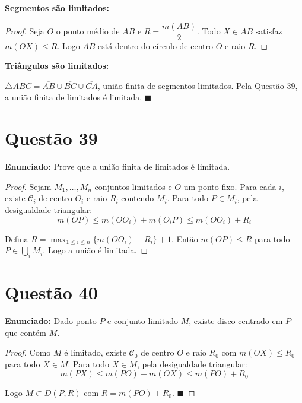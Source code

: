 \documentclass[12pt,a4paper]{article}
\begin{document}
\textbf{Segmentos s\~ao limitados:}

\begin{proof}
Seja $O$ o ponto m\'edio de $\overline{AB}$ e $R = \dfrac{m(AB)}{2}$. Todo $X \in \overline{AB}$ satisfaz $m(OX) \leq R$. Logo $\overline{AB}$ est\'a dentro do c\'irculo de centro $O$ e raio $R$.
\end{proof}

\textbf{Tri\^angulos s\~ao limitados:}

$\triangle ABC = \overline{AB} \cup \overline{BC} \cup \overline{CA}$, uni\~ao finita de segmentos limitados. Pela Quest\~ao 39, a uni\~ao finita de limitados \'e limitada. $\blacksquare$

\section*{Quest\~ao 39}

\textbf{Enunciado:} Prove que a uni\~ao finita de limitados \'e limitada.

\begin{proof}
Sejam $M_1, \ldots, M_n$ conjuntos limitados e $O$ um ponto fixo. Para cada $i$, existe $\mathcal{C}_i$ de centro $O_i$ e raio $R_i$ contendo $M_i$. Para todo $P \in M_i$, pela desigualdade triangular:
$$m(OP) \leq m(OO_i) + m(O_iP) \leq m(OO_i) + R_i$$

Defina $R = \max_{1 \leq i \leq n}\{m(OO_i) + R_i\} + 1$. Ent\~ao $m(OP) \leq R$ para todo $P \in \bigcup_i M_i$. Logo a uni\~ao \'e limitada.
\end{proof}

\section*{Quest\~ao 40}

\textbf{Enunciado:} Dado ponto $P$ e conjunto limitado $M$, existe disco centrado em $P$ que cont\'em $M$.

\begin{proof}
Como $M$ \'e limitado, existe $\mathcal{C}_0$ de centro $O$ e raio $R_0$ com $m(OX) \leq R_0$ para todo $X \in M$. Para todo $X \in M$, pela desigualdade triangular:
$$m(PX) \leq m(PO) + m(OX) \leq m(PO) + R_0$$

Logo $M \subset D(P, R)$ com $R = m(PO) + R_0$. $\blacksquare$
\end{proof}
\end{document}
